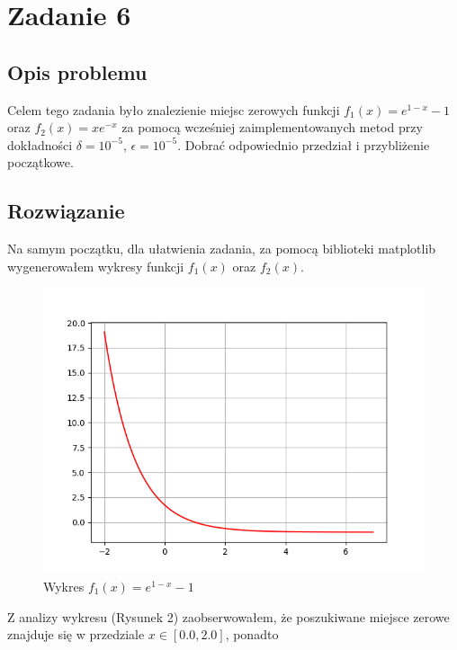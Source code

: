 \section{Zadanie 6}
\subsection{Opis problemu}
Celem tego zadania było znalezienie miejsc zerowych funkcji $ f_1(x) = e^{1 - x} - 1 $ oraz $ f_2(x) = xe^{-x} $ za pomocą wcześniej zaimplementowanych metod przy dokładności $ \delta = 10^{-5}$, $\epsilon = 10^{-5}$. Dobrać odpowiednio przedział i przybliżenie początkowe.
\subsection{Rozwiązanie}

Na samym początku, dla ułatwienia zadania, za pomocą biblioteki matplotlib wygenerowałem wykresy funkcji $ f_1(x)$ oraz $f_2(x)$.

\begin{figure}[!htbp]
  \centering  
  \includegraphics[totalheight=6cm]{../plots/ex6_f_1.png}
  \caption{Wykres $f_1(x) = e^{1 - x} - 1$}
\end{figure}

Z analizy wykresu (Rysunek 2) zaobserwowałem, że poszukiwane miejsce zerowe znajduje się w przedziale $ x \in [0.0, 2.0] $, ponadto

